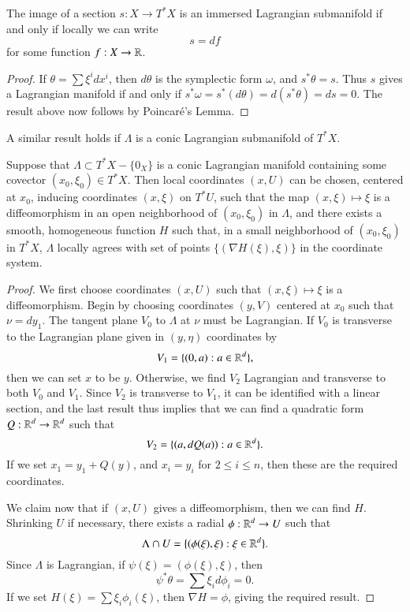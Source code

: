 \begin{lemma}
    The image of a section $s: X \to T^* X$ is an immersed Lagrangian submanifold if and only if locally we can write
    \[ s = d f \]
    for some function $f: X \to \operatorname{\mathbb{R}}$.
\end{lemma}
\begin{proof}
    If $\theta = \sum \xi^i dx^i$, then $d\theta$ is the symplectic form $\omega$, and $s^* \theta = s$. Thus $s$ gives a Lagrangian manifold if and only if $s^* \omega = s^*(d \theta) = d(s^* \theta) = ds = 0$. The result above now follows by Poincar\'{e}'s Lemma.
\end{proof}

A similar result holds if $\Lambda$ is a conic Lagrangian submanifold of $T^* X$.

\begin{lemma}
    Suppose that $\Lambda \subset T^* X - \{ 0_X \}$ is a conic Lagrangian manifold containing some covector $(x_0,\xi_0) \in T^* X$. Then local coordinates $(x,U)$ can be chosen, centered at $x_0$, inducing coordinates $(x,\xi)$ on $T^* U$, such that the map $(x,\xi) \mapsto \xi$ is a diffeomorphism in an open neighborhood of $(x_0,\xi_0)$ in $\Lambda$, and there exists a smooth, homogeneous function $H$ such that, in a small neighborhood of $(x_0,\xi_0)$ in $T^* X$, $\Lambda$ locally agrees with set of points  $\{ (\nabla H(\xi), \xi) \}$ in the coordinate system.
\end{lemma}
\begin{proof}
    We first choose coordinates $(x,U)$ such that $(x,\xi) \mapsto \xi$ is a diffeomorphism. Begin by choosing coordinates $(y,V)$ centered at $x_0$ such that $\nu = dy_1$. The tangent plane $V_0$ to $\Lambda$ at $\nu$ must be Lagrangian. If $V_0$ is transverse to the Lagrangian plane given in $(y,\eta)$ coordinates by
    \[ V_1 = \{ (0,a) : a \in \operatorname{\mathbb{R}}^d \}, \]
    then we can set $x$ to be $y$. Otherwise, we find $V_2$ Lagrangian and transverse to both $V_0$ and $V_1$. Since $V_2$ is transverse to $V_1$, it can be identified with a linear section, and the last result thus implies that we can find a quadratic form $Q: \operatorname{\mathbb{R}}^d \to \operatorname{\mathbb{R}}^d$ such that 
    \[ V_2 = \{ (a,dQ(a)) : a \in \operatorname{\mathbb{R}}^d \}. \]
    If we set $x_1 = y_1 + Q(y)$, and $x_i = y_i$ for $2 \leq i \leq n$, then these are the required coordinates.

    We claim now that if $(x,U)$ gives a diffeomorphism, then we can find $H$. Shrinking $U$ if necessary, there exists a radial $\phi: \operatorname{\mathbb{R}}^d \to U$ such that
    \[ \Lambda \cap U = \{ (\phi(\xi), \xi) : \xi \in \operatorname{\mathbb{R}}^d \}. \]
    Since $\Lambda$ is Lagrangian, if $\psi(\xi) = (\phi(\xi),\xi)$, then
    \[ \psi^* \theta = \sum \xi_i d\phi_i = 0. \]
    If we set $H(\xi) = \sum \xi_i \phi_i(\xi)$, then $\nabla H = \phi$, giving the required result.
\end{proof}

